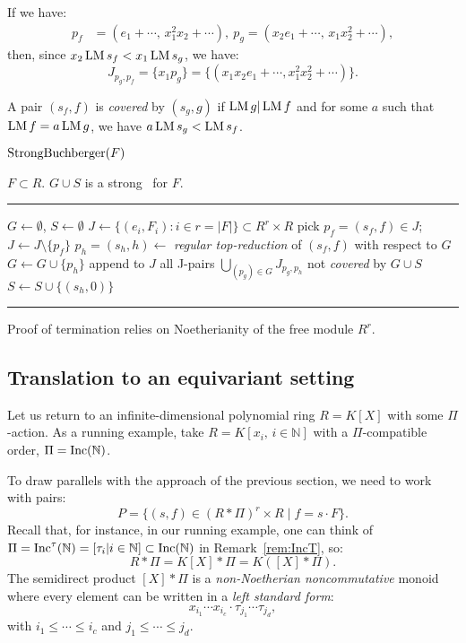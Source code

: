 \begin{example} If we have:
\begin{align*}
p_f &= (e_1+\cdots,\,x_1^2x_2+\cdots), \ p_g = (x_2e_1+\cdots,\,x_1x_2^2+\cdots),
\end{align*}
then, since $x_2\operatorname{LM} s_f < x_1\operatorname{LM} s_g$, we have:
\[
J_{p_g,p_f} = \{x_1p_g\} = \{(x_1x_2e_1+\cdots, x_1^2x_2^2+\cdots)\}.
\]
\end{example}

A pair $(s_f,f)$ is {\em covered} by $(s_g,g)$ if $\operatorname{LM} g | \operatorname{LM} f$ and for some $a$ such that $\operatorname{LM} f = a \operatorname{LM} g$, we have $a\operatorname{LM} s_g < \operatorname{LM} s_f$. 

\begin{algorithm} \label{alg:StrongBuchberger} 
$\operatorname{StrongBuchberger}(F)$

\begin{algorithmic}[1]
\REQUIRE $F \subset R$.
\ENSURE $G \cup S$ is a strong \GB\ for $F$.
\smallskip \hrule \smallskip

\STATE $G\gets \emptyset$, $S\gets \emptyset$ 
\STATE $J\gets \{(e_i,F_i):i\in r=|F|\} \subset R^r\times R$ 
	\STATE pick $p_f = (s_f,f) \in J$; $J\gets J\setminus\{p_f\}$
	\STATE $p_h=(s_h,h) \gets$ {\em regular top-reduction} of $(s_f,f)$ with respect to $G$
		\STATE $G\gets G\cup \{p_h\}$
		\STATE append to $J$ all J-pairs $\bigcup_{(p_g)\in G}J_{p_g,p_h}$ not {\em covered} by $G \cup S$ 
        \ELSE 
                \STATE $S\gets S\cup\{(s_h,0)\}$
	\ENDIF
\ENDWHILE
\smallskip \hrule \smallskip
\end{algorithmic}
\end{algorithm}

Proof of termination relies on Noetherianity of the free module $R^r$. 

\subsection{Translation to an equivariant setting}
Let us return to an infinite-dimensional polynomial ring $R=K[X]$ with some $\Pi$-action. As a running example, take $R=K[x_i,\, i\in\mathbb N]$ with a $\Pi$-compatible order, $\Pi=\operatorname{Inc}(\mathbb N)$.

To draw parallels with the approach of the previous section, we need to work with pairs:
\[
P = \{(s,f)\in (R*\Pi)^r\times R \mid f=s\cdot F\}.
\]
Recall that, for instance, in our running example, one can think of $\Pi=\operatorname{Inc}^\tau(\mathbb N) = [\tau_i|i\in\mathbb N]\subset \operatorname{Inc}(\mathbb N)$ in Remark~\ref{rem:IncT}, so: \[R*\Pi = K[X]*\Pi = K([X]*\Pi).\] 
The semidirect product $[X]*\Pi$ is a {\em non-Noetherian noncommutative} monoid where every element can be written in a \emph{left standard form}: 
$$
x_{i_1}\cdots x_{i_c} \cdot \tau_{j_1} \cdots \tau_{j_d},
$$
with $i_1 \leq \cdots \leq i_c$ and $j_1 \leq \cdots \leq j_d$. 

